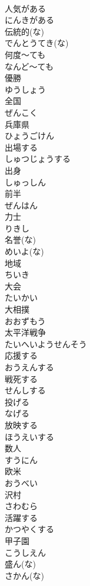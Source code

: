 \documentclass[8pt]{extreport}
\begin{document}
\begin{CJK}{UTF8}{min}
\\	人気がある	
\\	にんきがある
\\	伝統的(な)	
\\	でんとうてき(な)
\\	何度～ても	
\\	なんど～ても
\\	優勝	
\\	ゆうしょう
\\	全国	
\\	ぜんこく
\\	兵庫県	
\\	ひょうごけん
\\	出場する	
\\	しゅつじょうする
\\	出身	
\\	しゅっしん
\\	前半	
\\	ぜんはん
\\	力士	
\\	りきし
\\	名誉(な)	
\\	めいよ(な)
\\	地域	
\\	ちいき
\\	大会	
\\	たいかい
\\	大相撲	
\\	おおずもう
\\	太平洋戦争	
\\	たいへいようせんそう
\\	応援する	
\\	おうえんする
\\	戦死する	
\\	せんしする
\\	投げる	
\\	なげる
\\	放映する	
\\	ほうえいする
\\	数人	
\\	すうにん
\\	欧米	
\\	おうべい
\\	沢村	
\\	さわむら
\\	活躍する	
\\	かつやくする
\\	甲子園	
\\	こうしえん
\\	盛ん(な)	
\\	さかん(な)

\end{CJK}
\end{document}
